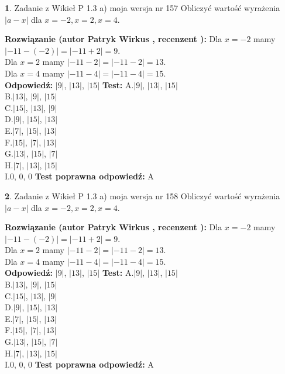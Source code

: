 \documentclass[12pt, a4paper]{article}
\theoremstyle{definition} %
\newtheorem{zad}{}
\newcommand{\zadStart}[1]{\begin{zad}#1\newline}
\newcommand{\zadStop}{\end{zad}}
\newcommand{\rozwStart}[2]{\noindent \textbf{Rozwiązanie (autor #1 , recenzent #2): }\newline}
\newcommand{\rozwStop}{\newline}
\newcommand{\odpStart}{\noindent \textbf{Odpowiedź:}\newline}
\newcommand{\odpStop}{\newline}
\newcommand{\testStart}{\noindent \textbf{Test:}\newline}
\newcommand{\testStop}{\newline}
\newcommand{\kluczStart}{\noindent \textbf{Test poprawna odpowiedź:}\newline}
\newcommand{\kluczStop}{\newline}
\begin{document}
\zadStart{Zadanie z Wikieł P 1.3 a) moja wersja nr 157}
Obliczyć wartość wyrażenia $|a - x|$ dla $x=-2,x=2,x=4$.
\zadStop
\rozwStart{Patryk Wirkus}{}
Dla $x = -2$ mamy $|-11 - (-2)| = |-11 + 2| = 9$.\\
Dla $x = 2$ mamy $|-11 - 2| = |-11 - 2| = 13$.\\
Dla $x = 4$ mamy $|-11 - 4| = |-11 - 4| = 15$.\\
\rozwStop
\odpStart
$|9|$, $|13|$, $|15|$
\odpStop
\testStart
A.$|9|$, $|13|$, $|15|$\\
B.$|13|$, $|9|$, $|15|$\\
C.$|15|$, $|13|$, $|9|$\\
D.$|9|$, $|15|$, $|13|$\\
E.$|7|$, $|15|$, $|13|$\\
F.$|15|$, $|7|$, $|13|$\\
G.$|13|$, $|15|$, $|7|$\\
H.$|7|$, $|13|$, $|15|$\\
I.$0$, $0$, $0$
\testStop
\kluczStart
A
\kluczStop



\zadStart{Zadanie z Wikieł P 1.3 a) moja wersja nr 158}
Obliczyć wartość wyrażenia $|a - x|$ dla $x=-2,x=2,x=4$.
\zadStop
\rozwStart{Patryk Wirkus}{}
Dla $x = -2$ mamy $|-11 - (-2)| = |-11 + 2| = 9$.\\
Dla $x = 2$ mamy $|-11 - 2| = |-11 - 2| = 13$.\\
Dla $x = 4$ mamy $|-11 - 4| = |-11 - 4| = 15$.\\
\rozwStop
\odpStart
$|9|$, $|13|$, $|15|$
\odpStop
\testStart
A.$|9|$, $|13|$, $|15|$\\
B.$|13|$, $|9|$, $|15|$\\
C.$|15|$, $|13|$, $|9|$\\
D.$|9|$, $|15|$, $|13|$\\
E.$|7|$, $|15|$, $|13|$\\
F.$|15|$, $|7|$, $|13|$\\
G.$|13|$, $|15|$, $|7|$\\
H.$|7|$, $|13|$, $|15|$\\
I.$0$, $0$, $0$
\testStop
\kluczStart
A
\kluczStop
\end{document}

